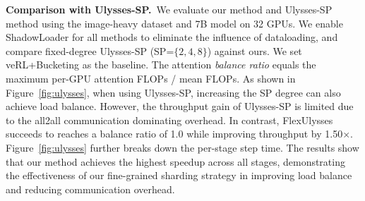 \noindent\textbf{Comparison with Ulysses-SP.}~We evaluate our method and Ulysses-SP method using the image-heavy dataset and 7B model on 32 GPUs. We enable ShadowLoader for all methods to eliminate the influence of dataloading, and compare fixed-degree Ulysses-SP (SP=$\{2,4,8\}$) against ours. We set veRL+Bucketing as the baseline. The attention \emph{balance ratio} equals the maximum per-GPU attention FLOPs / mean FLOPs. As shown in Figure~\ref{fig:ulysses}, when using Ulysses-SP, increasing the SP degree can also achieve load balance. However, the throughput gain of Ulysses-SP is limited due to the all2all communication dominating overhead. In contrast, FlexUlysses succeeds to reaches a balance ratio of 1.0 while improving throughput by 1.50$\times$. Figure~\ref{fig:ulysses} further breaks down the per-stage step time. The results show that our method achieves the highest speedup across all stages, demonstrating the effectiveness of our fine-grained sharding strategy in improving load balance and reducing communication overhead.






